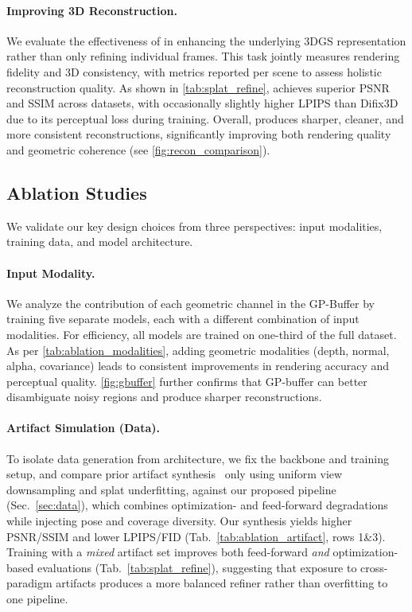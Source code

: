 


\paragraph{Improving 3D Reconstruction.}
We evaluate the effectiveness of \ours in enhancing the underlying 3DGS representation rather than only refining individual frames. 
This task jointly measures rendering fidelity and 3D consistency, with metrics reported per scene to assess holistic reconstruction quality. 
As shown in \cref{tab:splat_refine}, \ours achieves superior PSNR and SSIM across datasets, with occasionally slightly higher LPIPS than Difix3D due to its perceptual loss during training. 
Overall, \ours produces sharper, cleaner, and more consistent reconstructions, significantly improving both rendering quality and geometric coherence (see \cref{fig:recon_comparison}).








\subsection{Ablation Studies}
We validate our key design choices from three perspectives: input modalities, training data, and model architecture.
\vspace{-5mm}


\paragraph{Input Modality.} We analyze the contribution of each geometric channel in the GP-Buffer by training five separate models, each with a different combination of input modalities. For efficiency, all models are trained on one-third of the full dataset. As per \cref{tab:ablation_modalities}, adding geometric modalities (depth, normal, alpha, covariance) leads to consistent improvements in rendering accuracy and perceptual quality. \cref{fig:gbuffer} further confirms that GP-buffer can better disambiguate noisy regions and produce sharper reconstructions.


\paragraph{Artifact Simulation (Data).}
To isolate data generation from architecture, we fix the backbone and training setup, and compare prior artifact synthesis~\cite{Kim_2025_ExploreGS,Wu2025GenFusion,wu2025difix3d} only using uniform view downsampling and splat underfitting, against our proposed pipeline (Sec.~\ref{sec:data}), which combines optimization- and feed-forward degradations while injecting pose and coverage diversity. 
Our synthesis yields higher PSNR/SSIM and lower LPIPS/FID (Tab.~\ref{tab:ablation_artifact}, rows 1\&3). Training with a \emph{mixed} artifact set improves both feed-forward \emph{and} optimization-based evaluations (Tab.~\ref{tab:splat_refine}), suggesting that exposure to cross-paradigm artifacts produces a more balanced refiner rather than overfitting to one pipeline.


